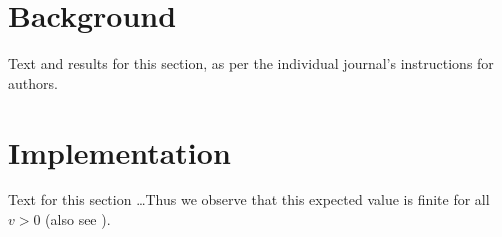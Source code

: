 \documentclass{bmcart}
\begin{document}
\begin{frontmatter}
\begin{abstractbox}
\begin{keyword}
\end{keyword}


\end{abstractbox}
%

\end{frontmatter}



\section*{Background}

Text and results for this section, as per the individual journal's instructions
for authors.

\section*{Implementation}

Text for this section \ldots Thus we observe that this expected value is finite
for all $v>0$ (also see \cite{koon,khar,zvai,xjon,marg}).
\end{document}
